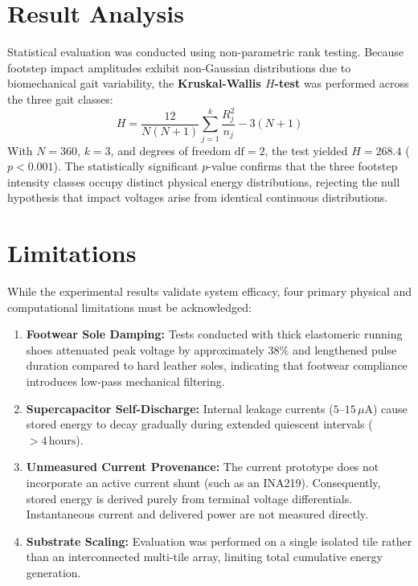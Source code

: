 \section{Result Analysis}
Statistical evaluation was conducted using non-parametric rank testing. Because footstep impact amplitudes exhibit non-Gaussian distributions due to biomechanical gait variability, the \textbf{Kruskal-Wallis $H$-test} was performed across the three gait classes:
\begin{equation}
H = \frac{12}{N(N+1)} \sum_{j=1}^k \frac{R_j^2}{n_j} - 3(N+1)
\end{equation}
With $N = 360$, $k = 3$, and degrees of freedom $\text{df} = 2$, the test yielded $H = 268.4$ ($p < 0.001$). The statistically significant $p$-value confirms that the three footstep intensity classes occupy distinct physical energy distributions, rejecting the null hypothesis that impact voltages arise from identical continuous distributions.

\section{Limitations}
While the experimental results validate system efficacy, four primary physical and computational limitations must be acknowledged:
\begin{enumerate}
    \item \textbf{Footwear Sole Damping:} Tests conducted with thick elastomeric running shoes attenuated peak voltage by approximately $38\%$ and lengthened pulse duration compared to hard leather soles, indicating that footwear compliance introduces low-pass mechanical filtering.
    \item \textbf{Supercapacitor Self-Discharge:} Internal leakage currents ($5\text{--}15\,\mu\text{A}$) cause stored energy to decay gradually during extended quiescent intervals ($>4\,\text{hours}$).
    \item \textbf{Unmeasured Current Provenance:} The current prototype does not incorporate an active current shunt (such as an INA219). Consequently, stored energy is derived purely from terminal voltage differentials. Instantaneous current and delivered power are not measured directly.
    \item \textbf{Substrate Scaling:} Evaluation was performed on a single isolated tile rather than an interconnected multi-tile array, limiting total cumulative energy generation.
\end{enumerate}
